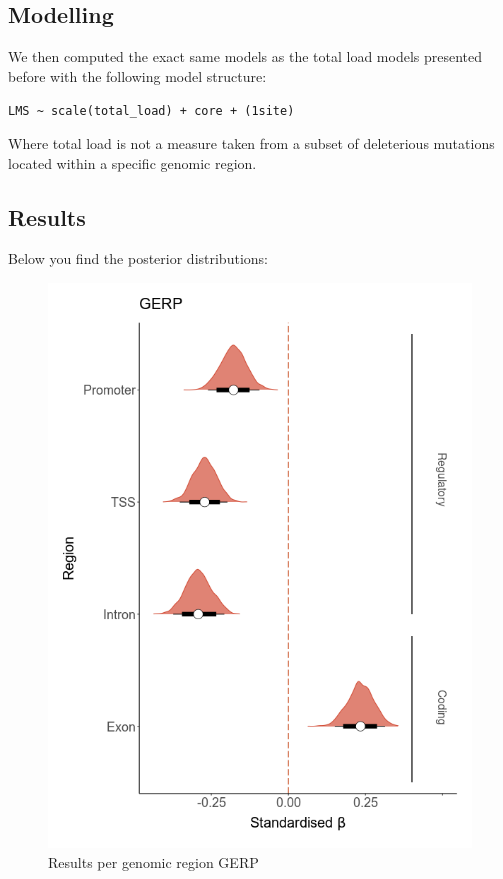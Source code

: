 \documentclass[
  letterpaper,
  DIV=11,
  numbers=noendperiod]{scrreprt}
\begin{document}
\hypertarget{modelling}{%
\subsection{Modelling}\label{modelling}}

We then computed the exact same models as the total load models
presented before with the following model structure:

\texttt{LMS\ \textasciitilde{}\ scale(total\_load)\ +\ core\ +\ (1\textbar{}site)}

Where total load is not a measure taken from a subset of deleterious
mutations located within a specific genomic region.

\hypertarget{results-3}{%
\subsection{Results}\label{results-3}}

Below you find the posterior distributions:

\begin{figure}

{\centering \includegraphics{qmd/../plots/main/fig_2c.png}

}

\caption{Results per genomic region GERP}

\end{figure}
\end{document}
